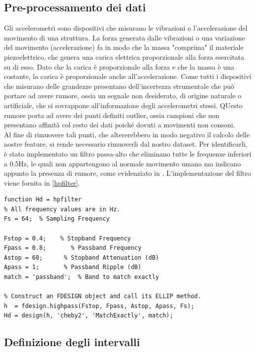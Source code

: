 \subsection{Pre-processamento dei dati}
Gli accelerometri sono dispositivi che misurano le vibrazioni o l'accelerazione del movimento di una struttura. La forza generata dalle vibrazioni o una variazione del movimento (accelerazione) fa in modo che la massa "comprima" il materiale piezoelettrico, che genera una carica elettrica proporzionale alla forza esercitata su di esso. Dato che la carica è proporzionale alla forza e che la massa è una costante, la carica è proporzionale anche all'accelerazione. Come tutti i dispositivi che misurano delle grandezze presentano dell'incertezza strumentale che può portare ad avere rumore, ossia un segnale non desiderato, di origine naturale o artificiale, che si sovrappone all'informazione degli accelerometri stessi. QUesto rumore porta ad avere dei punti definiti outlier, ossia campioni che non presentano affinità col resto dei dati poiché dovuti a movimenti non consoni.\\
Al fine di rimuovere tali punti, che altererebbero in modo negativo il calcolo delle nostre feature, si rende necessario rimuoverli dal nostro dataset. Per identificarli, è stato implementato un filtro passa-alto che eliminano tutte le frequenze inferiori a 0.5Hz, le quali non appartengono al normale movimento umano ma indicano appunto la presenza di rumore, come evidenziato in \cite{21}. L'implementazione del filtro viene fornita in \ref{hpfilter}.
\begin{lstlisting}[frame=single, caption=hpfilter, label=hpfilter]  % Start your code-block
function Hd = hpfilter
% All frequency values are in Hz.
Fs = 64;  % Sampling Frequency

Fstop = 0.4;    % Stopband Frequency
Fpass = 0.8;       % Passband Frequency
Astop = 60;      % Stopband Attenuation (dB)
Apass = 1;       % Passband Ripple (dB)
match = 'passband';  % Band to match exactly

% Construct an FDESIGN object and call its ELLIP method.
h  = fdesign.highpass(Fstop, Fpass, Astop, Apass, Fs);
Hd = design(h, 'cheby2', 'MatchExactly', match);
\end{lstlisting}
\subsection{Definizione degli intervalli}

